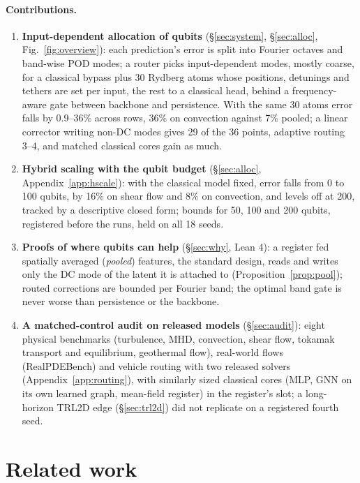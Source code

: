 \documentclass{article}
\newcommand{\AllocRange}{0.9--36\%}
\begin{document}
\paragraph{Contributions.}
\begin{enumerate}
  \item \textbf{Input-dependent allocation of qubits} (\S\ref{sec:system}, \S\ref{sec:alloc}, Fig.~\ref{fig:overview}):
  each prediction's error is split into Fourier octaves and band-wise POD modes; a router picks input-dependent modes,
  mostly coarse, for a classical bypass plus 30 Rydberg atoms whose positions, detunings and tethers are set per input,
  the rest to a classical head, behind a frequency-aware gate between backbone and persistence. With the same 30 atoms error falls by
  \AllocRange{} across rows, 36\% on convection against 7\% pooled; a linear corrector writing non-DC modes gives 29 of the
  36 points, adaptive routing 3--4, and matched classical cores gain as much.
  \item \textbf{Hybrid scaling with the qubit budget} (\S\ref{sec:alloc}, Appendix~\ref{app:hscale}): with the classical
  model fixed, error falls from 0 to 100 qubits, by 16\% on shear flow and 8\% on convection, and levels off at 200,
  tracked by a descriptive closed form; bounds for 50, 100 and 200 qubits, registered before the runs, held on all 18 seeds.
  \item \textbf{Proofs of where qubits can help} (\S\ref{sec:why}, Lean 4): a register fed spatially averaged (\emph{pooled}) features, the standard design, reads and writes only the DC mode of the latent it is attached to (Proposition~\ref{prop:pool}); routed corrections are
  bounded per Fourier band; the optimal band gate is never worse than persistence or the backbone.
  \item \textbf{A matched-control audit on released models} (\S\ref{sec:audit}): eight physical benchmarks (turbulence,
  MHD, convection, shear flow, tokamak transport and equilibrium, geothermal flow), real-world flows (RealPDEBench) and vehicle routing with two released solvers
  (Appendix~\ref{app:routing}), with similarly sized classical cores (MLP, GNN on its own learned graph, mean-field
  register) in the register's slot; a long-horizon TRL2D edge (\S\ref{sec:trl2d}) did not replicate on a registered fourth seed.
\end{enumerate}

\section{Related work}
\label{sec:related}
\end{document}
